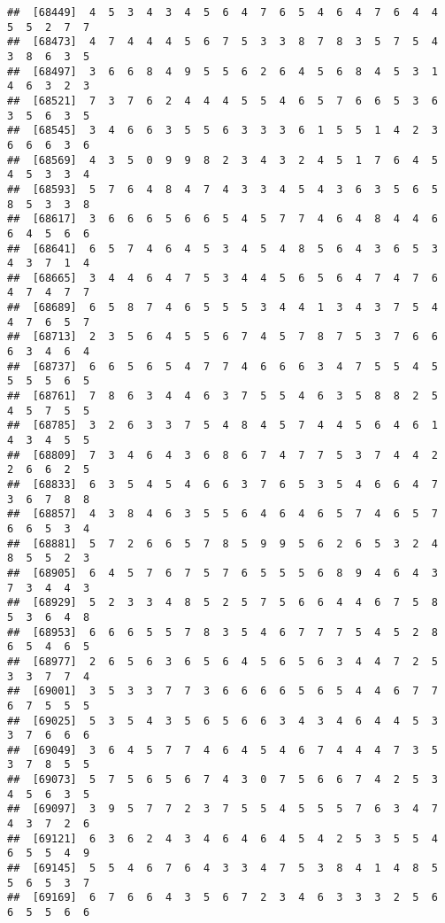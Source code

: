 \documentclass[
]{book}
\begin{document}
\begin{verbatim}
##  [68449]  4  5  3  4  3  4  5  6  4  7  6  5  4  6  4  7  6  4  4  5  5  2  7  7
##  [68473]  4  7  4  4  4  5  6  7  5  3  3  8  7  8  3  5  7  5  4  3  8  6  3  5
##  [68497]  3  6  6  8  4  9  5  5  6  2  6  4  5  6  8  4  5  3  1  4  6  3  2  3
##  [68521]  7  3  7  6  2  4  4  4  5  5  4  6  5  7  6  6  5  3  6  3  5  6  3  5
##  [68545]  3  4  6  6  3  5  5  6  3  3  3  6  1  5  5  1  4  2  3  6  6  6  3  6
##  [68569]  4  3  5  0  9  9  8  2  3  4  3  2  4  5  1  7  6  4  5  4  5  3  3  4
##  [68593]  5  7  6  4  8  4  7  4  3  3  4  5  4  3  6  3  5  6  5  8  5  3  3  8
##  [68617]  3  6  6  6  5  6  6  5  4  5  7  7  4  6  4  8  4  4  6  6  4  5  6  6
##  [68641]  6  5  7  4  6  4  5  3  4  5  4  8  5  6  4  3  6  5  3  4  3  7  1  4
##  [68665]  3  4  4  6  4  7  5  3  4  4  5  6  5  6  4  7  4  7  6  4  7  4  7  7
##  [68689]  6  5  8  7  4  6  5  5  5  3  4  4  1  3  4  3  7  5  4  4  7  6  5  7
##  [68713]  2  3  5  6  4  5  5  6  7  4  5  7  8  7  5  3  7  6  6  6  3  4  6  4
##  [68737]  6  6  5  6  5  4  7  7  4  6  6  6  3  4  7  5  5  4  5  5  5  5  6  5
##  [68761]  7  8  6  3  4  4  6  3  7  5  5  4  6  3  5  8  8  2  5  4  5  7  5  5
##  [68785]  3  2  6  3  3  7  5  4  8  4  5  7  4  4  5  6  4  6  1  4  3  4  5  5
##  [68809]  7  3  4  6  4  3  6  8  6  7  4  7  7  5  3  7  4  4  2  2  6  6  2  5
##  [68833]  6  3  5  4  5  4  6  6  3  7  6  5  3  5  4  6  6  4  7  3  6  7  8  8
##  [68857]  4  3  8  4  6  3  5  5  6  4  6  4  6  5  7  4  6  5  7  6  6  5  3  4
##  [68881]  5  7  2  6  6  5  7  8  5  9  9  5  6  2  6  5  3  2  4  8  5  5  2  3
##  [68905]  6  4  5  7  6  7  5  7  6  5  5  5  6  8  9  4  6  4  3  7  3  4  4  3
##  [68929]  5  2  3  3  4  8  5  2  5  7  5  6  6  4  4  6  7  5  8  5  3  6  4  8
##  [68953]  6  6  6  5  5  7  8  3  5  4  6  7  7  7  5  4  5  2  8  6  5  4  6  5
##  [68977]  2  6  5  6  3  6  5  6  4  5  6  5  6  3  4  4  7  2  5  3  3  7  7  4
##  [69001]  3  5  3  3  7  7  3  6  6  6  6  5  6  5  4  4  6  7  7  6  7  5  5  5
##  [69025]  5  3  5  4  3  5  6  5  6  6  3  4  3  4  6  4  4  5  3  3  7  6  6  6
##  [69049]  3  6  4  5  7  7  4  6  4  5  4  6  7  4  4  4  7  3  5  3  7  8  5  5
##  [69073]  5  7  5  6  5  6  7  4  3  0  7  5  6  6  7  4  2  5  3  4  5  6  3  5
##  [69097]  3  9  5  7  7  2  3  7  5  5  4  5  5  5  7  6  3  4  7  4  3  7  2  6
##  [69121]  6  3  6  2  4  3  4  6  4  6  4  5  4  2  5  3  5  5  4  6  5  5  4  9
##  [69145]  5  5  4  6  7  6  4  3  3  4  7  5  3  8  4  1  4  8  5  5  6  5  3  7
##  [69169]  6  7  6  6  4  3  5  6  7  2  3  4  6  3  3  3  2  5  6  6  5  5  6  6

\end{verbatim}
\end{document}
